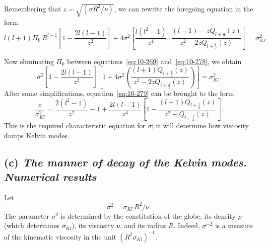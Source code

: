 Remembering that $z = \sqrt{(\sigma R^2/\nu)}$, we can rewrite the foregoing equation in the form
\begin{equation}
\label{eq:10-278}
l(l+1)\Pi_0\,R^{l-1}\!\left[1-\frac{2l(l-1)}{z^2}\right]+4\sigma^2\!\left[\frac{l(l^2-1)}{z^4}\cdot\frac{(l-1)-zQ_{l+\frac{1}{2}}(z)}{z^2-2zQ_{l+\frac{1}{2}}(z)}\right] = \sigma_{Kl}^2.
\end{equation}

Now eliminating $\Pi_0$ between equations~\eqref{eq:10-269} and~\eqref{eq:10-278}, we obtain
\begin{equation}
\label{eq:10-279}
\sigma^2\!\left[1-\frac{2l(l-1)}{z^2}\right]\!\left[1+4\sigma^2\!\left(\frac{(l+1)Q_{l+\frac{1}{2}}(z)}{z^2-2zQ_{l+\frac{1}{2}}(z)}\right)\right] = \sigma_{Kl}^2.
\end{equation}
After some simplifications, equation~\eqref{eq:10-279} can be brought to the form
\begin{equation}
\label{eq:10-280}
\frac{\sigma}{\sigma_{Kl}^2} = \frac{2(l^2-1)}{z^2}-1+\frac{2l(l-1)}{z^4}\!\left[1-\frac{(l+1)Q_{l+\frac{1}{2}}(z)}{z^2-Q_{l+\frac{1}{2}}(z)}\right]\!.
\end{equation}
This is the required characteristic equation for $\sigma$; it will determine how viscosity damps Kelvin modes.

\subsection*{(c) \textit{The manner of decay of the Kelvin modes. Numerical results}}

Let
\begin{equation}
\label{eq:10-281}
\sigma^2 = \sigma_{Kl}\,R^2/\nu.
\end{equation}
The parameter $\sigma^2$ is determined by the constitution of the globe; its density $\rho$ (which determines $\sigma_{Kl}$), its viscosity $\nu$, and its radius $R$. Indeed, $\sigma^{-2}$ is a measure of the kinematic viscosity in the unit $(R^2\sigma_{Kl})^{-1}$.

